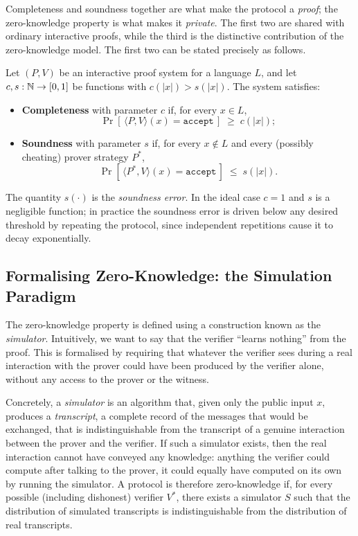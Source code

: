 \medskip

Completeness and soundness together are what make the protocol a \emph{proof}; the zero-knowledge property is what makes it \emph{private}. The first two are shared with ordinary interactive proofs, while the third is the distinctive contribution of the zero-knowledge model. The first two can be stated precisely as follows.

\begin{definition}
\label{def:completeness-soundness}
Let $(P, V)$ be an interactive proof system for a language $L$, and let $c, s : \mathbb N \to [0,1]$ be functions with $c(|x|) > s(|x|)$. The system satisfies:
\begin{itemize}
    \item \textbf{Completeness} with parameter $c$ if, for every $x \in L$,
    \[
        \Pr\!\left[\, \langle P, V \rangle(x) = \mathtt{accept} \,\right] \;\ge\; c(|x|);
    \]
    \item \textbf{Soundness} with parameter $s$ if, for every $x \notin L$ and every (possibly cheating) prover strategy $P^{*}$,
    \[
        \Pr\!\left[\, \langle P^{*}, V \rangle(x) = \mathtt{accept} \,\right] \;\le\; s(|x|).
    \]
\end{itemize}
The quantity $s(\cdot)$ is the \emph{soundness error}. In the ideal case $c = 1$ and $s$ is a negligible function; in practice the soundness error is driven below any desired threshold by repeating the protocol, since independent repetitions cause it to decay exponentially.
\end{definition}

\subsection{Formalising Zero-Knowledge: the Simulation Paradigm}
\label{subsec:bg-simulation}

The zero-knowledge property is defined using a construction known as the \emph{simulator}. Intuitively, we want to say that the verifier ``learns nothing'' from the proof. This is formalised by requiring that whatever the verifier sees during a real interaction with the prover could have been produced by the verifier alone, without any access to the prover or the witness.

\medskip

Concretely, a \emph{simulator} is an algorithm that, given only the public input $x$, produces a \emph{transcript}, a complete record of the messages that would be exchanged, that is indistinguishable from the transcript of a genuine interaction between the prover and the verifier. If such a simulator exists, then the real interaction cannot have conveyed any knowledge: anything the verifier could compute after talking to the prover, it could equally have computed on its own by running the simulator. A protocol is therefore zero-knowledge if, for every possible (including dishonest) verifier $V^{*}$, there exists a simulator $S$ such that the distribution of simulated transcripts is indistinguishable from the distribution of real transcripts.


